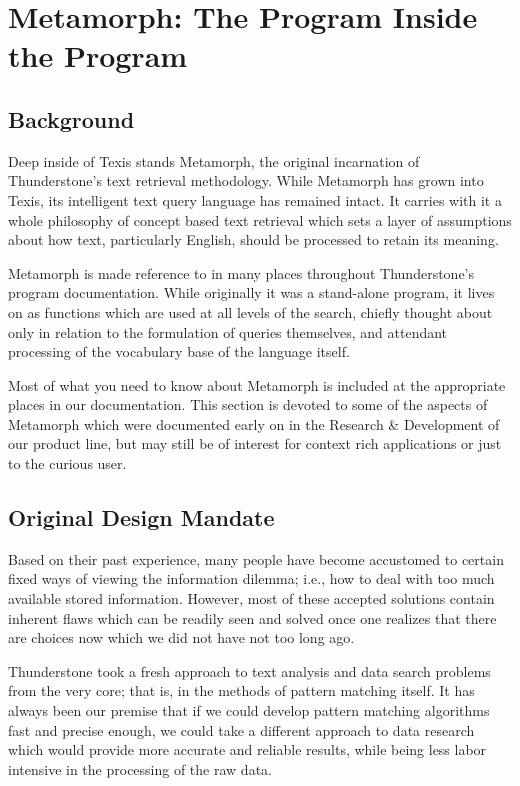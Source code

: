 \chapter{Metamorph: The Program Inside the Program}

\section{Background}

Deep inside of Texis stands Metamorph, the original
incarnation of Thunderstone's text retrieval methodology.
While Metamorph has grown into Texis, its intelligent
text query language has remained intact. It carries with
it a whole philosophy of concept based text retrieval
which sets a layer of assumptions about how text, particularly
English, should be processed to retain its meaning.

Metamorph is made reference to in many places throughout
Thunderstone's program documentation.  While originally
it was a stand-alone program, it lives on as functions
which are used at all levels of the search, chiefly
thought about only in relation to the formulation of queries
themselves, and attendant processing of the vocabulary
base of the language itself.

Most of what you need to know about Metamorph is included
at the appropriate places in our documentation.  This
section is devoted to some of the aspects of Metamorph
which were documented early on in the Research \& Development
of our product line, but may still be of interest for
context rich applications or just to the curious user.

\section{Original Design Mandate}

Based on their past experience, many people have become accustomed to
certain fixed ways of viewing the information dilemma; i.e., how to
deal with too much available stored information.  However, most of
these accepted solutions contain inherent flaws which can be readily
seen and solved once one realizes that there are choices now which we
did not have not too long ago.

Thunderstone took a fresh approach to text analysis and data
search problems from the very core; that is, in the methods of pattern
matching itself.  It has always been our premise that if we could
develop pattern matching algorithms fast and precise enough, we could
take a different approach to data research which would provide more
accurate and reliable results, while being less labor intensive in the
processing of the raw data.

